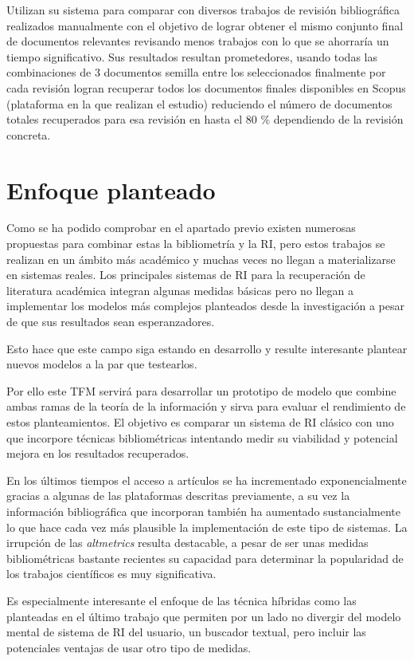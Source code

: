 Utilizan su sistema para comparar con diversos trabajos de revisión bibliográfica realizados manualmente con el objetivo de lograr obtener el mismo conjunto final de documentos relevantes revisando menos trabajos con lo que se ahorraría un tiempo significativo. Sus resultados resultan prometedores, usando todas las combinaciones de 3 documentos semilla entre los seleccionados finalmente por cada revisión logran recuperar todos los documentos finales disponibles en Scopus (plataforma en la que realizan el estudio) reduciendo el número de documentos totales recuperados para esa revisión en hasta el 80 \% dependiendo de la revisión concreta.


\section{Enfoque planteado}
Como se ha podido comprobar en el apartado previo existen numerosas propuestas para combinar estas la bibliometría y la \acrshort{RI}, pero estos trabajos se realizan en un ámbito más académico y muchas veces no llegan a materializarse en sistemas reales. Los principales sistemas de \acrshort{RI} para la recuperación de literatura académica integran algunas medidas básicas pero no llegan a implementar los modelos más complejos planteados desde la investigación a pesar de que sus resultados sean esperanzadores. 

Esto hace que este campo siga estando en desarrollo y resulte interesante plantear nuevos modelos a la par que testearlos.

Por ello este \acrshort{TFM} servirá para desarrollar un prototipo de modelo que combine ambas ramas de la teoría de la información y sirva para evaluar el rendimiento de estos planteamientos. El objetivo es comparar un sistema de \acrshort{RI} clásico con uno que incorpore técnicas bibliométricas intentando medir su viabilidad y potencial mejora en los resultados recuperados.

En los últimos tiempos el acceso a artículos se ha incrementado exponencialmente gracias a algunas de las plataformas descritas previamente, a su vez la información bibliográfica que incorporan también ha aumentado sustancialmente lo que hace cada vez más plausible la implementación de este tipo de sistemas. La irrupción de las \textit{altmetrics} resulta destacable, a pesar de ser unas medidas bibliométricas bastante recientes su capacidad para determinar la popularidad de los trabajos científicos es muy significativa.

Es especialmente interesante el enfoque de las técnica híbridas como las planteadas en el último trabajo que permiten por un lado no divergir del modelo mental de sistema de \acrshort{RI} del usuario, un buscador textual, pero incluir las potenciales ventajas de usar otro tipo de medidas. 

